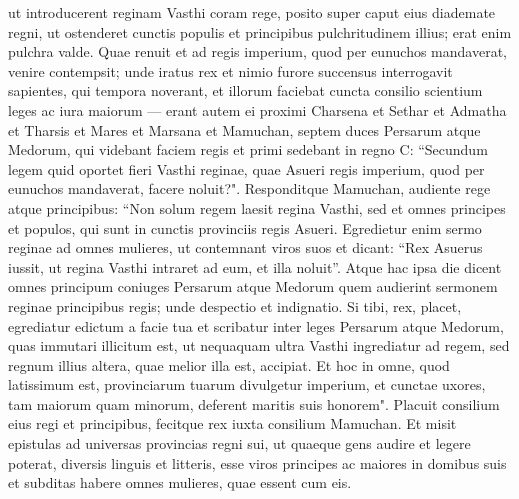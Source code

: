 \begin{biblechapter}
\verse ut introducerent reginam Vasthi coram rege, posito super caput eius diademate regni, ut ostenderet cunctis populis et principibus pulchritudinem illius; erat enim pulchra valde. 
\verse Quae renuit et ad regis imperium, quod per eunuchos mandaverat, venire contempsit; unde iratus rex et nimio furore succensus 
\verse interrogavit sapientes, qui tempora noverant, et illorum faciebat cuncta consilio scientium leges ac iura maiorum — 
\verse erant autem ei proximi Charsena et Sethar et Admatha et Tharsis et Mares et Marsana et Mamuchan, septem duces Persarum atque Medorum, qui videbant faciem regis et primi sedebant in regno C: 
\verse “Secundum legem quid oportet fieri Vasthi reginae, quae Asueri regis imperium, quod per eunuchos mandaverat, facere noluit?". 
\verse Responditque Mamuchan, audiente rege atque principibus: “Non solum regem laesit regina Vasthi, sed et omnes principes et populos, qui sunt in cunctis provinciis regis Asueri. 
\verse Egredietur enim sermo reginae ad omnes mulieres, ut contemnant viros suos et dicant: “Rex Asuerus iussit, ut regina Vasthi intraret ad eum, et illa noluit”. 
\verse Atque hac ipsa die dicent omnes principum coniuges Persarum atque Medorum quem audierint sermonem reginae principibus regis; unde despectio et indignatio. 
\verse Si tibi, rex, placet, egrediatur edictum a facie tua et scribatur inter leges Persarum atque Medorum, quas immutari illicitum est, ut nequaquam ultra Vasthi ingrediatur ad regem, sed regnum illius altera, quae melior illa est, accipiat. 
\verse Et hoc in omne, quod latissimum est, provinciarum tuarum divulgetur imperium, et cunctae uxores, tam maiorum quam minorum, deferent maritis suis honorem". 
\verse Placuit consilium eius regi et principibus, fecitque rex iuxta consilium Mamuchan. 
\verse Et misit epistulas ad universas provincias regni sui, ut quaeque gens audire et legere poterat, diversis linguis et litteris, esse viros principes ac maiores in domibus suis et subditas habere omnes mulieres, quae essent cum eis. 
\end{biblechapter}

